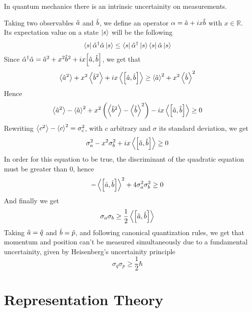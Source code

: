 \documentclass[../qm.tex]{subfiles}
\begin{document}
	\begin{pos}
		In quantum mechanics there is an intrinsic uncertainity on measurements.
	\end{pos}
		Taking two observables $\hat{a}$ and $\hat{b}$, we define an operator $\alpha=\hat{a}+ix\hat{b}$ with $x\in\mathbb{R}$.\\
		Its expectation value on a state $\ket{s}$ will be the following
		\begin{equation*}
			\bra{s}\hat{\alpha}^{\dagger}\hat{\alpha}\ket{s}\le\bra{s}\hat{\alpha}^{\dagger}\ket{s}\bra{s}\hat{\alpha}\ket{s}
		\end{equation*}
		Since $\adj{\opr{\alpha}}\opr{\alpha}=\opr{a}^2+x^2\opr{b}^2+ix\comm{\opr{a}}{\opr{b}}$, we get that
		\begin{equation*}
			\expval{\opr{a}^2}+x^2\expval{\opr{b}^2}+ix\expval{\comm{\opr{a}}{\opr{b}}}\ge\expval{\opr{a}}^2+x^2\expval{\opr{b}}^2
		\end{equation*}
		Hence
		\begin{equation*}
			\expval{\opr{a}^2}-\expval{\opr{a}}^2+x^2\left( \expval{\opr{b}^2}-\expval{\opr{b}}^2 \right)-ix\expval{\comm{\opr{a}}{\opr{b}}}\ge0
		\end{equation*}
		Rewriting $\expval{c^2}-\expval{c}^2=\sigma_c^2$, with $c$ arbitrary and $\sigma$ its standard deviation, we get
		\begin{equation*}
			\sigma_a^2-x^2\sigma_b^2+ix\expval{\comm{\opr{a}}{\opr{b}}}\ge0
		\end{equation*}
		In order for this equation to be true, the discriminant of the quadratic equation must be greater than $0$, hence
		\begin{equation*}
			-\expval{\comm{\opr{a}}{\opr{b}}}^2+4\sigma_a^2\sigma_b^2\ge0
		\end{equation*}
		And finally we get
		\begin{equation*}
			\sigma_a\sigma_b\ge\frac{1}{2}\expval{\comm{\opr{a}}{\opr{b}}}
		\end{equation*}
		Taking $\hat{a}=\hat{q}$ and $\hat{b}=\hat{p}$, and following canonical quantization rules, we get that momentum and position can't be measured simultaneously due to a fundamental uncertainity, given by Heisenberg's uncertainity principle
		\begin{equation}
			\sigma_q\sigma_p\ge\frac{1}{2}\hbar
			\label{eq:heisenberguncqp}
		\end{equation}
	\section{Representation Theory}
\end{document}
